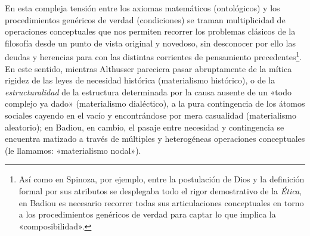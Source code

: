 En esta compleja tensión entre los axiomas matemáticos (ontológicos) y los procedimientos genéricos de verdad (condiciones) se traman multiplicidad de operaciones conceptuales que nos permiten recorrer los problemas clásicos de la filosofía desde un punto de vista original y novedoso, sin desconocer por ello las deudas y herencias para con las distintas corrientes de pensamiento precedentes\footnote{Así como en Spinoza, por ejemplo, entre la postulación de Dios y la definición formal por sus atributos se desplegaba todo el rigor demostrativo de la \emph{Ética}, en Badiou es necesario recorrer todas sus articulaciones conceptuales en torno a los procedimientos genéricos de verdad para captar lo que implica la «composibilidad».}. En este sentido, mientras Althusser pareciera pasar abruptamente de la mítica rigidez de las leyes de necesidad histórica (materialismo histórico), o de la \emph{estructuralidad} de la estructura determinada por la causa ausente de un «todo complejo ya dado» (materialismo dialéctico), a la pura contingencia de los átomos sociales cayendo en el vacío y encontrándose por mera casualidad (materialismo aleatorio); en Badiou, en cambio, el pasaje entre necesidad y contingencia se encuentra matizado a través de múltiples y heterogéneas operaciones conceptuales (le llamamos: «materialismo nodal»).


